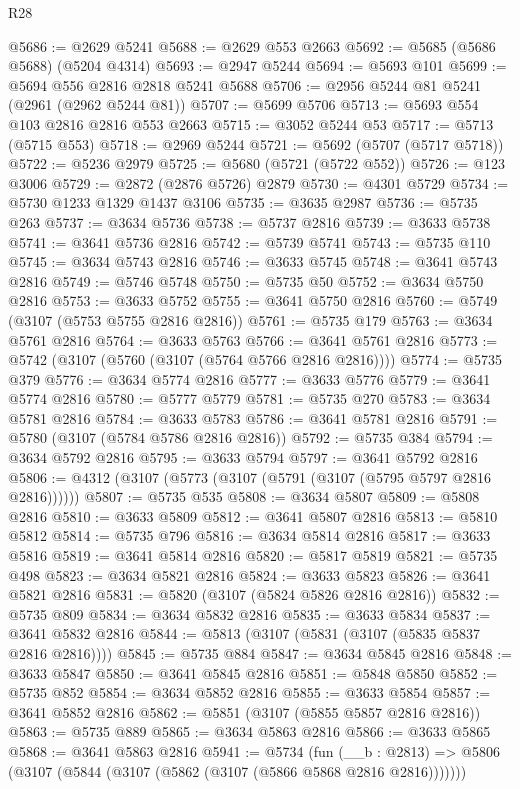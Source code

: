 \begin{lexlean}{R28}
\begin{coremodule}
@5686 := @2629 @5241
@5688 := @2629 @553 @2663
@5692 := @5685 (@5686 @5688) (@5204 @4314)
@5693 := @2947 @5244
@5694 := @5693 @101
@5699 := @5694 @556 @2816 @2818 @5241 @5688
@5706 := @2956 @5244 @81 @5241 (@2961 (@2962 @5244 @81))
@5707 := @5699 @5706
@5713 := @5693 @554 @103 @2816 @2816 @553 @2663
@5715 := @3052 @5244 @53
@5717 := @5713 (@5715 @553)
@5718 := @2969 @5244
@5721 := @5692 (@5707 (@5717 @5718))
@5722 := @5236 @2979
@5725 := @5680 (@5721 (@5722 @552))
@5726 := @123 @3006
@5729 := @2872 (@2876 @5726) @2879
@5730 := @4301 @5729
@5734 := @5730 @1233 @1329 @1437 @3106
@5735 := @3635 @2987
@5736 := @5735 @263
@5737 := @3634 @5736
@5738 := @5737 @2816
@5739 := @3633 @5738
@5741 := @3641 @5736 @2816
@5742 := @5739 @5741
@5743 := @5735 @110
@5745 := @3634 @5743 @2816
@5746 := @3633 @5745
@5748 := @3641 @5743 @2816
@5749 := @5746 @5748
@5750 := @5735 @50
@5752 := @3634 @5750 @2816
@5753 := @3633 @5752
@5755 := @3641 @5750 @2816
@5760 := @5749 (@3107 (@5753 @5755 @2816 @2816))
@5761 := @5735 @179
@5763 := @3634 @5761 @2816
@5764 := @3633 @5763
@5766 := @3641 @5761 @2816
@5773 := @5742 (@3107 (@5760 (@3107 (@5764 @5766 @2816 @2816))))
@5774 := @5735 @379
@5776 := @3634 @5774 @2816
@5777 := @3633 @5776
@5779 := @3641 @5774 @2816
@5780 := @5777 @5779
@5781 := @5735 @270
@5783 := @3634 @5781 @2816
@5784 := @3633 @5783
@5786 := @3641 @5781 @2816
@5791 := @5780 (@3107 (@5784 @5786 @2816 @2816))
@5792 := @5735 @384
@5794 := @3634 @5792 @2816
@5795 := @3633 @5794
@5797 := @3641 @5792 @2816
@5806 := @4312 (@3107 (@5773 (@3107 (@5791 (@3107 (@5795 @5797 @2816 @2816))))))
@5807 := @5735 @535
@5808 := @3634 @5807
@5809 := @5808 @2816
@5810 := @3633 @5809
@5812 := @3641 @5807 @2816
@5813 := @5810 @5812
@5814 := @5735 @796
@5816 := @3634 @5814 @2816
@5817 := @3633 @5816
@5819 := @3641 @5814 @2816
@5820 := @5817 @5819
@5821 := @5735 @498
@5823 := @3634 @5821 @2816
@5824 := @3633 @5823
@5826 := @3641 @5821 @2816
@5831 := @5820 (@3107 (@5824 @5826 @2816 @2816))
@5832 := @5735 @809
@5834 := @3634 @5832 @2816
@5835 := @3633 @5834
@5837 := @3641 @5832 @2816
@5844 := @5813 (@3107 (@5831 (@3107 (@5835 @5837 @2816 @2816))))
@5845 := @5735 @884
@5847 := @3634 @5845 @2816
@5848 := @3633 @5847
@5850 := @3641 @5845 @2816
@5851 := @5848 @5850
@5852 := @5735 @852
@5854 := @3634 @5852 @2816
@5855 := @3633 @5854
@5857 := @3641 @5852 @2816
@5862 := @5851 (@3107 (@5855 @5857 @2816 @2816))
@5863 := @5735 @889
@5865 := @3634 @5863 @2816
@5866 := @3633 @5865
@5868 := @3641 @5863 @2816
@5941 := @5734
    (fun (__b : @2813) => @5806 (@3107 (@5844 (@3107 (@5862 (@3107 (@5866 @5868 @2816 @2816)))))))

\end{coremodule}
\end{lexlean}
